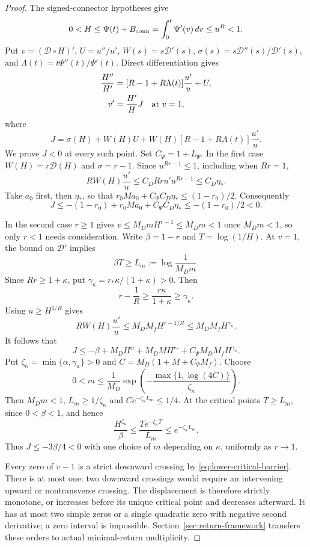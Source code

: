 \begin{proof}
The signed-connector hypotheses give
\[
 0<H\le\Psi(t)+B_{\rm conn}
      =\int_0^t\Psi'(v)\,dv\le u^R<1.
\]
Put $v=(\mathcal D\circ H)'$, $U=u''/u'$,
$W(s)=s\mathcal D'(s)$, $\sigma(s)=s\mathcal D''(s)/\mathcal D'(s)$,
and $\Lambda(t)=t\Psi''(t)/\Psi'(t)$. Direct differentiation gives
\begin{equation}\label{eq:lower-critical-barrier}
 \begin{aligned}
 \frac{H''}{H'}&=[R-1+R\Lambda(t)]\frac{u'}u+U,\\
 v'&=\frac{H'}H J\quad\hbox{at }v=1,
 \end{aligned}
\end{equation}
where
\[
 J=\sigma(H)+W(H)U+
        W(H)[R-1+R\Lambda(t)]\frac{u'}u.
\]
We prove $J<0$ at every such point. Set $C_\Psi=1+L_\Psi$.
In the first case $W(H)=r\mathcal D(H)$ and $\sigma=r-1$.
Since $u^{Rr-1}\le1$, including when $Rr=1$,
\[
 R W(H)\frac{u'}u
 \le C_D Rr u'u^{Rr-1}\le C_D\eta_*.
\]
Take $a_0$ first, then $\eta_*$, so that
$r_0Ma_0+C_\Psi C_D\eta_*\le(1-r_0)/2$. Consequently
\[
 J\le-(1-r_0)+r_0Ma_0+C_\Psi C_D\eta_*
   \le-(1-r_0)/2<0.
\]

In the second case $r\ge1$ gives $v\le M_DmH^{r-1}\le M_Dm<1$
once $M_Dm<1$, so only $r<1$ needs consideration.
Write $\beta=1-r$ and $T=\log(1/H)$.
At $v=1$, the bound on $\mathcal D'$ implies
\[
 \beta T\ge L_m:=\log\frac1{M_Dm}.
\]
Since $Rr\ge1+\kappa$, put
$\gamma_\kappa=r_*\kappa/(1+\kappa)>0$. Then
\[
 r-\frac1R\ge\frac{r\kappa}{1+\kappa}\ge\gamma_\kappa.
\]
Using $u\ge H^{1/R}$ gives
\[
 R W(H)\frac{u'}u\le M_D M_f H^{r-1/R}
                  \le M_D M_f H^{\gamma_\kappa}.
\]
It follows that
\[
 J\le-\beta+M_DH^\alpha+M_DM H^{r_*}
                      +C_\Psi M_DM_f H^{\gamma_\kappa}.
\]
Put $\zeta_\kappa=\min\{\alpha,\gamma_\kappa\}>0$ and
$C=M_D(1+M+C_\Psi M_f)$. Choose
\[
 0<m\le\frac1{M_D}
       \exp\left(-\frac{\max\{1,\log(4C)\}}{\zeta_\kappa}\right).
\]
Then $M_Dm<1$, $L_m\ge1/\zeta_\kappa$ and
$Ce^{-\zeta_\kappa L_m}\le1/4$.
At the critical points $T\ge L_m$, since $0<\beta<1$, and hence
\[
 \frac{H^{\zeta_\kappa}}{\beta}
 \le\frac{T e^{-\zeta_\kappa T}}{L_m}
 \le e^{-\zeta_\kappa L_m}.
\]
Thus $J\le-3\beta/4<0$ with one choice of $m$ depending on $\kappa$,
uniformly as $r\to1$.

Every zero of $v-1$ is a strict downward crossing by
\eqref{eq:lower-critical-barrier}. There is at most one: two downward
crossings would require an intervening upward or nontransverse crossing.
The displacement is therefore strictly monotone, or increases before
its unique critical point and decreases afterward. It has at most two
simple zeros or a single quadratic zero with negative second derivative;
a zero interval is impossible. Section~\ref{sec:return-framework}
transfers these orders to actual minimal-return multiplicity.
\end{proof}

